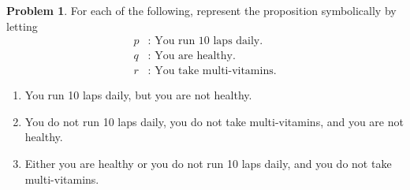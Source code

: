 \documentclass[a4paper,12pt]{article}
\numberwithin{equation}{section}
\theoremstyle{plain}
\theoremstyle{definition}
\newtheorem{problem}{Problem}
\begin{document}
\begin{problem}
	For each of the following, represent the proposition symbolically by letting
	\begin{align*}
	p &: \textrm{ You run 10 laps daily.} \\
	q &: \textrm{ You are healthy.} \\
	r &: \textrm{ You take multi-vitamins.}
	\end{align*}
	\begin{enumerate}[label= (\alph*)]
		\item You run 10 laps daily, but you are not healthy. 
		\item You do not run 10 laps daily, you do not take multi-vitamins, and you are not healthy. 
		\item Either you are healthy or you do not run 10 laps daily, and you do not take multi-vitamins. 
	\end{enumerate}
\end{problem}
\end{document}
